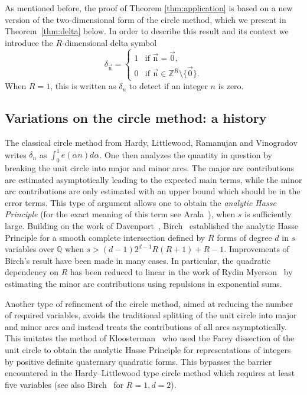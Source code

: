 \documentclass[letterpaper,11pt]{amsart}
\numberwithin{equation}{section}
\theoremstyle{definition}
\numberwithin{equation}{section}
\newcommand{\ZZ}{\mathbb{Z}}
\newcommand{\QQ}{\mathbb{Q}}
\newcommand{\nn}{\vec{\mathrm{n}}}
\begin{document}
As mentioned before, the proof of Theorem \ref{thm:application} is based on a new version of the two-dimensional form of the circle method, which we present in Theorem~\ref{thm:delta} below. In order to describe this result and its context we introduce the $R$-dimensional delta symbol
\begin{equation}
    \label{eq:delta_def}
\delta_{\nn} =\begin{cases} 1&\text{if }\nn=\vec{0},\\0&\text{if }\nn\in\ZZ^R\setminus\{\vec{0}\}.\end{cases}
\end{equation}
When \(R=1\), this is written as \(\delta_n\) to detect if an integer $n$ is zero. 

\subsection{Variations on the circle method: a history}

The classical circle method from Hardy, Littlewood, Ramanujan and Vinogradov writes $\delta_n$ as $\int_{0}^1 e(\alpha n)d\alpha$. One then analyzes the quantity in question by breaking the unit circle into major and minor arcs. The major arc contributions are estimated asymptotically leading to the expected main terms, while the minor arc contributions are only estimated with an upper bound which should be in the error terms.  This type of argument allows one to obtain the \emph{analytic Hasse Principle} (for the exact meaning of this term see Arala~\cite{Arala}), when $s$ is sufficiently large. Building on the work of Davenport~\cite{Davenport}, Birch~\cite{Birch} established the analytic Hasse Principle for a smooth complete intersection defined by $R$ forms of degree $d$ in $s$ variables over $\QQ$ when $s>(d-1)2^{d-1}R(R+1)+R-1$. Improvements of Birch's result have been made in many cases. In particular, the quadratic dependency on $R$ has been reduced to linear in the work of Rydin Myerson~\cite{Myerson} by estimating the minor arc contributions using repulsions in exponential sums.  

Another type of refinement of the circle method, aimed at reducing the number of required variables, avoids the traditional splitting of the unit circle into major and minor arcs and instead treats the contributions of all arcs asymptotically. This imitates the method of Kloosterman~\cite{Kloosterman} who used
the Farey dissection of the unit circle to 
obtain the analytic Hasse Principle for representations of integers by positive definite quaternary quadratic forms. This bypasses the barrier encountered in the Hardy--Littlewood type circle method which requires at least five variables (see also Birch~\cite{Birch} for $R=1, d=2$). 
\end{document}
